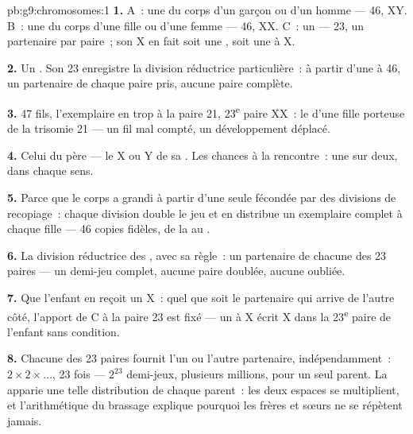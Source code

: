\begin{solution}{pb:g9:chromosomes:1}
\textbf{1.} A~: une  du corps d'un garçon ou d'un
homme --- 46, XY. B~: une  du corps d'une fille ou
d'une femme --- 46, XX. C~: un  --- 23, un partenaire
par paire~; son X en fait soit une , soit une
 à X.

\textbf{2.} Un . Son 23 enregistre la division
réductrice particulière~: à partir d'une  à 46, un
partenaire de chaque paire pris, aucune paire complète.

\textbf{3.} 47 fils, l'exemplaire en trop à la paire 21,
23\textsuperscript{e} paire XX~: le  d'une fille porteuse de
la trisomie 21 --- un fil mal compté, un développement
déplacé.

\textbf{4.} Celui du père --- le X ou Y de sa .
Les chances à la rencontre~: une sur deux, dans chaque sens.

\textbf{5.} Parce que le corps a grandi à partir d'une seule
 fécondée par des divisions de recopiage~:
chaque division double le jeu et en distribue un exemplaire
complet à chaque  fille --- 46 copies fidèles, de la
 au .

\textbf{6.} La division réductrice des , avec sa
règle~: un partenaire de chacune des 23 paires --- un
demi-jeu complet, aucune paire doublée, aucune oubliée.

\textbf{7.} Que l'enfant en reçoit un X~: quel que soit le
partenaire qui arrive de l'autre côté, l'apport de C à la
paire 23 est fixé --- un  à X écrit X dans la
23\textsuperscript{e} paire de l'enfant sans condition.

\textbf{8.} Chacune des 23 paires fournit l'un ou l'autre
partenaire, indépendamment~: $2 \times 2 \times \dots$, 23
fois --- $2^{23}$ demi-jeux, plusieurs millions, pour un
seul parent. La  apparie une telle distribution
de chaque parent~: les deux espaces se multiplient, et
l'arithmétique du brassage explique pourquoi les frères et
sœurs ne se répètent jamais.


\end{solution}
